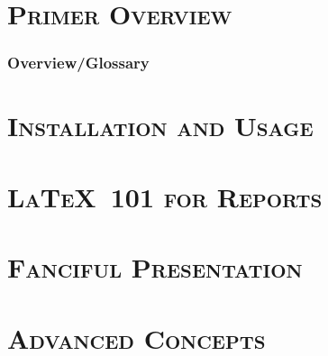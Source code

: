 \def \uswdwmspkg{the \texttt{uswdwms} package}

\pagebreak
\part{\textsc{Primer Overview}}

\pagebreak
\section{Overview/Glossary}
\pagebreak
\part{\textsc{Installation and Usage}}

\pagebreak
\part{\textsc{\LaTeX\ 101 for Reports}}

\pagebreak
\part{\textsc{Fanciful Presentation}}

\pagebreak
\part{\textsc{Advanced Concepts}}

\pagebreak

